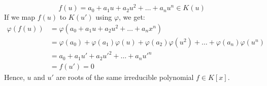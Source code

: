 \documentclass[12pt]{article}
\begin{document}
$$f(u)=a_0+a_1u+a_2u^2+\ldots+a_nu^n\in K(u)$$
If we map $f(u)$ to $K(u')$ using $\varphi$, we get:
\begin{align*}    
\varphi(f(u))&=\varphi(a_0+a_1u+a_2u^2+\ldots+a_nx^n) \\
&=\varphi(a_0)+\varphi(a_1)\varphi(u)+\varphi(a_2)\varphi(u^2)+\ldots+\varphi(a_n)\varphi(u^n) \\
&=a_0+a_1u'+a_2u'^2+\ldots+a_nu'^n \\
&=f(u')=0
\end{align*}
Hence, $u$ and $u'$ are roots of the same irreducible polynomial $f\in K[x]$.
\end{document}
